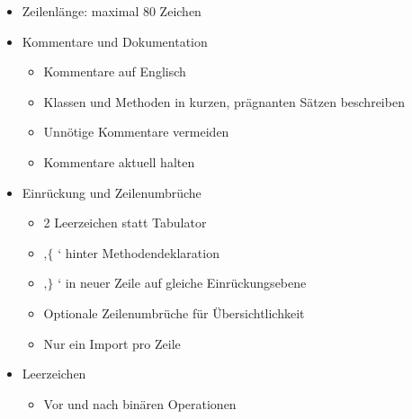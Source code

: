 \documentclass[twoside]{report}
\begin{document}
\begin{itemize}
	\item Zeilenlänge: maximal 80 Zeichen\par

	\item Kommentare und Dokumentation\par

\begin{itemize}
	\item Kommentare auf Englisch\par

	\item Klassen und Methoden in kurzen, prägnanten Sätzen beschreiben\par

	\item Unnötige Kommentare vermeiden\par

	\item Kommentare aktuell halten\par


\end{itemize}
	\item Einrückung und Zeilenumbrüche\par

\begin{itemize}
	\item 2 Leerzeichen statt Tabulator\par

	\item ‚$ \{ $ ‘ hinter Methodendeklaration\par

	\item ‚$ \} $ ‘ in neuer Zeile auf gleiche Einrückungsebene\par

	\item Optionale Zeilenumbrüche für Übersichtlichkeit\par

	\item Nur ein Import pro Zeile\par


\end{itemize}
	\item Leerzeichen\par

\begin{itemize}
	\item Vor und nach binären Operationen\par


\end{itemize}
\end{itemize}
\end{document}
